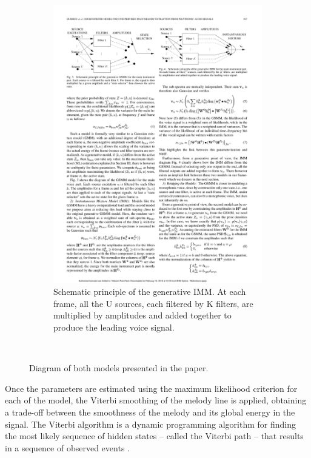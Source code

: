 \begin{figure}
\begin{subfigure}[b]{0.47\textwidth}
                \includegraphics[width=\textwidth]{Figures/imm}
                \caption{Schematic principle of the generative IMM. At each frame, all the U sources, each filtered by K filters, are multiplied by amplitudes and added together to produce the leading voice signal.}
                \label{fig:Controller}
        \end{subfigure}
          \caption{Diagram of both models presented in the paper\cite{durrieu}.}
        ~ %
        \label{fig:gsmmimm}
\end{figure}

Once the parameters are estimated using the maximum likelihood criterion for each of the model, the Viterbi smoothing of the melody line is applied, obtaining a trade-off between the smoothness of the melody and its global energy in the signal. The Viterbi algorithm is a dynamic programming algorithm for finding the most likely sequence of hidden states – called the Viterbi path – that results in a sequence of observed events \cite{viterbi}.
 
